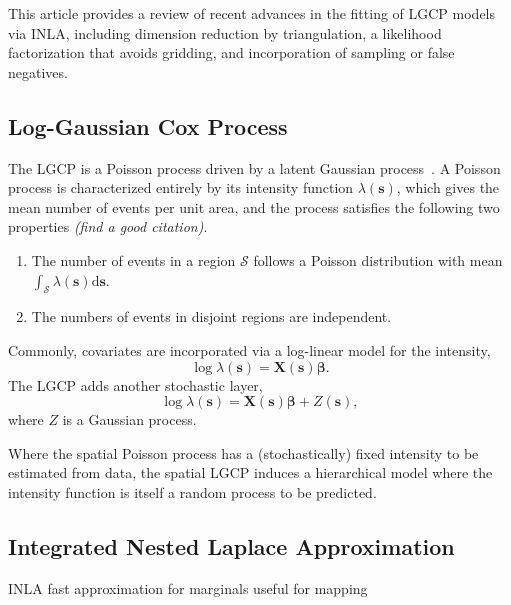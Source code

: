 \documentclass[]{interact}
\begin{document}
This article provides a review of recent advances in the fitting of LGCP models
via INLA, including dimension reduction by triangulation, a likelihood
factorization that avoids gridding, and incorporation of sampling or false
negatives.


\subsection{Log-Gaussian Cox Process}

The LGCP is a Poisson process driven by a latent Gaussian
process~\cite{moelleretal}. A Poisson process is characterized entirely by its
intensity function \(\lambda(\mathbf{s})\), which gives the mean number of events
per unit area, and the process satisfies the following two properties
{\it (find a good citation)}.
\begin{enumerate}
\item The number of events in a region \(\mathcal{S}\) follows a Poisson
distribution with mean
\(\int_{\mathcal{S}} \lambda(\mathbf{s})\mathrm{d}\mathbf{s}\).
\item The numbers of events in disjoint regions are independent.
\end{enumerate}

Commonly, covariates are incorporated via a log-linear model for the intensity,
\begin{displaymath}
\log\lambda(\mathbf{s}) = \mathbf{X}(\mathbf{s}) \boldsymbol{\beta}.
\end{displaymath}
The LGCP adds another stochastic layer,
\begin{displaymath}
\log\lambda(\mathbf{s}) = \mathbf{X}(\mathbf{s}) \boldsymbol{\beta}
+ Z(\mathbf{s}),
\end{displaymath}
where \(Z\) is a Gaussian process.

Where the spatial Poisson process has a (stochastically) fixed intensity to be
estimated from data, the spatial LGCP induces a hierarchical model where the
intensity function is itself a random process to be predicted.



\subsection{Integrated Nested Laplace Approximation}

INLA fast approximation for marginals useful for mapping \cite{rueetal}
\end{document}
